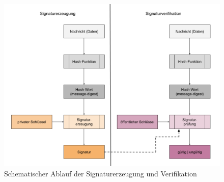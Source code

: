 \documentclass[11pt,a4paper,ngerman]{scrreprt}
\begin{document}
\begin{figure}[h]
    \centering
        \includegraphics[width=\textwidth]{Abbildungen/Ablauf_Signatur.png}
    \caption{Schematischer Ablauf der Signaturerzeugung und Verifikation}
    \label{fig:Signaturablauf}
\end{figure}
\end{document}

